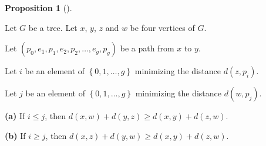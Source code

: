 \documentclass[numbers=enddot,12pt,final,onecolumn,notitlepage]{scrartcl}%
\theoremstyle{definition}
\newtheorem{prop}[theo]{Proposition}
\newenvironment{proposition}[1][]
{\begin{prop}[#1]\begin{leftbar}}
{\end{leftbar}\end{prop}}
\newcommand{\set}[1]{\left\{ #1 \right\}}
\newcommand{\tup}[1]{\left( #1 \right)}
\begin{document}
\begin{proposition} \label{prop.mt2.tropigrass.xyzw}
Let $G$ be a tree.
Let $x$, $y$, $z$ and $w$ be four vertices of $G$.

Let $\tup{p_0, e_1, p_1, e_2, p_2, \ldots, e_g, p_g}$ be a path
from $x$ to $y$.

Let $i$ be an element of $\set{0, 1, \ldots, g}$ minimizing the
distance $d \tup{z, p_i}$.

Let $j$ be an element of $\set{0, 1, \ldots, g}$ minimizing the
distance $d \tup{w, p_j}$.

\textbf{(a)} If $i \leq j$, then
$d \tup{x, w} + d \tup{y, z} \geq d \tup{x, y} + d \tup{z, w}$.

\textbf{(b)} If $i \geq j$, then
$d \tup{x, z} + d \tup{y, w} \geq d \tup{x, y} + d \tup{z, w}$.
\end{proposition}
\end{document}
